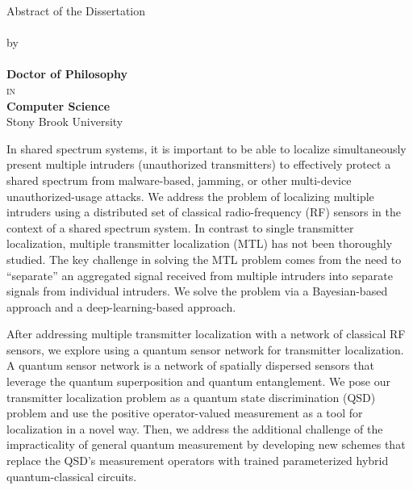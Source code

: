 \begin{center}
    Abstract of the Dissertation  \\
    \vspace{0.25cm}
    \textbf{\ttitle}  \\
    \vspace{0.25cm}
    by    \\
    \vspace{0.25cm}
    \textbf{\authorname}  \\
    \vspace{0.25cm}
    \textbf{Doctor of Philosophy}  \\
    \vspace{0.25cm}
    \textsc{in}  \\
    \vspace{0.25cm}
    \textbf{Computer Science}   \\
    \vspace{0.25cm}
    Stony Brook University    \\
\end{center}

In shared spectrum systems, it is important to be able to localize simultaneously present multiple intruders 
(unauthorized transmitters) to effectively protect a shared spectrum from malware-based, jamming, 
or other multi-device unauthorized-usage attacks. We address the problem of localizing multiple intruders using 
a distributed set of classical radio-frequency (RF) sensors in the context of a shared spectrum system. 
In contrast to single transmitter localization, multiple transmitter localization (MTL) has not been thoroughly studied. 
The key challenge in solving the MTL problem comes from the need to “separate” an aggregated signal received from 
multiple intruders into separate signals from individual intruders. We solve the problem via a Bayesian-based approach 
and a deep-learning-based approach. 

After addressing multiple transmitter localization with a network of classical RF sensors, 
we explore using a quantum sensor network for transmitter localization. 
A quantum sensor network is a network of spatially dispersed sensors that leverage the quantum superposition and quantum entanglement. We pose our transmitter localization problem as 
a quantum state discrimination (QSD) problem and use the positive operator-valued measurement as a tool 
for localization in a novel way. Then, we address the additional challenge of the impracticality 
of general quantum measurement by developing new schemes that replace the QSD’s measurement operators 
with trained parameterized hybrid quantum-classical circuits. 

